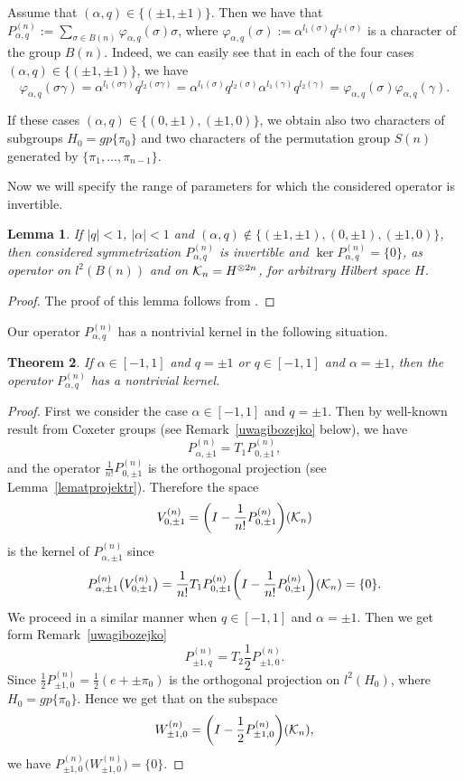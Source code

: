 \documentclass[pdftex]{sigma}
\numberwithin{equation}{section}
\newtheorem{Theorem}{Theorem}[section]
\newtheorem{Lemma}[Theorem]{Lemma}
\def\id{I}
\def\H{{\bf \mathcal K}_{ n}}
\newcommand{\q}{q}
\newcommand{\s}{\alpha}%
\begin{document}
\begin{Remark}
Assume that $(\s,\q)\in\{(\pm 1,\pm 1)\}$.
Then we have that $P_{\s,\q}^{(n)}:= \sum_{\sigma \in B(n)}\varphi_{\s,\q}(\sigma)\sigma$, where $\varphi_{\s,\q}(\sigma):= \s^{l_1(\sigma)} \q^{l_2(\sigma)} $
is a character of the group $B(n)$.
Indeed, we can easily see that in each of the four cases $(\s,\q)\in\{(\pm 1,\pm 1)\}$, we have
\[
\varphi_{\s,\q}(\sigma\gamma)=\s^{l_1(\sigma\gamma)} \q^{l_2(\sigma\gamma)}=\s^{l_1(\sigma)} \q^{l_2(\sigma)}\s^{l_1(\gamma)}\q^{l_2(\gamma)}=\varphi_{\s,\q}(\sigma)\varphi_{\s,\q}(\gamma).
\]

If these cases $(\s,\q)\in\{(0,\pm 1),(\pm 1,0)\}$, we obtain also two characters of subgroups $H_0=gp\{\pi_0\}$ and two characters of the permutation group $S(n) $ generated by $\{\pi_1,\dots,\pi_{n-1}\}$.
\end{Remark}

Now we will specify the range of parameters for which the considered operator is invertible.

\begin{Lemma} %
If $|\q|< 1$, $|\s|< 1$ and $(\s,\q)\notin\{(\pm 1,\pm 1),(0,\pm 1),(\pm1,0)\}$, then considered sym\-metriza\-tion ${P_{\s,\q}^{(n)}}$ is invertible and $\ker {P_{\s,\q}^{(n)}}=\{0\}$, as operator on $l^2(B(n))$ and on $\H=H^{\otimes 2n}$, for arbitrary
Hilbert space $H$.
\end{Lemma}
\begin{proof}
The proof of this lemma follows from \cite[Theorem 2.4]{BozejkoSpeicher1994}.
\end{proof}

Our operator $P^{(n)}_{\s,\q}$ has a nontrivial kernel in the following situation.

\begin{Theorem}
If $\s\in[-1,1]$ and $q=\pm1$ or $\q\in[-1,1]$ and $\s=\pm1$, then the operator $P^{(n)}_{\s,\q}$ has a nontrivial kernel.
\end{Theorem}

\begin{proof}
First we consider the case $\s\in[-1,1]$ and $q=\pm1$. Then by well-known result from Coxeter groups (see Remark~\ref{uwagibozejko} below), we have
\[
P_{\s,\pm1}^{(n)}=T_1P_{0,\pm1}^{(n)},
\]
and the operator $\frac{1}{n!}P_{0,\pm1}^{(n)}$ is the orthogonal projection (see Lemma~\ref{lematprojektr}). Therefore the space
\[
V_{0,\pm1}^{(n)}=\bigg(\id-\frac{1}{n!}P_{0,\pm1}^{(n)}\bigg)(\H)
\]
is the kernel of $P_{\s,\pm1}^{(n)}$ since
\[
P_{\s,\pm1}^{(n)}\big(V_{0,\pm1}^{(n)}\big) =\frac{1}{n!}T_1P_{0,\pm1}^{(n)} \bigg(\id-\frac{1}{n!}P_{0,\pm1}^{(n)}\bigg)(\H)=\{0\}.
\]
We proceed in a similar manner when $\q\in[-1,1]$ and $\s=\pm1$. Then we get form Remark~\ref{uwagibozejko}
\[
P_{\pm1,\q}^{(n)}=T_2 \frac{1}{2}P_{\pm1,0}^{(n)}.
\]
Since $\frac{1}{2}P_{\pm1,0}^{(n)}=\frac{1}{2}(e+\pm \pi_0)$ is the orthogonal projection on $l^2(H_0)$, where $H_0=gp\{\pi_0\}$. Hence we get that on the subspace
\[
W_{\pm1,0}^{(n)}=\bigg(\id-\frac{1}{2}P_{\pm1,0}^{(n)}\bigg)(\H),
\]
we have $P_{\pm1,0}^{(n)}\big(W_{\pm1,0}^{(n)}\big)=\{0\}$.
\end{proof}
\end{document}

